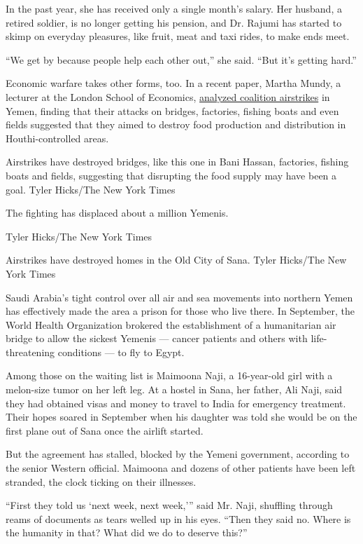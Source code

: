 In the past year, she has received only a single month's salary. Her
husband, a retired soldier, is no longer getting his pension, and Dr.
Rajumi has started to skimp on everyday pleasures, like fruit, meat and
taxi rides, to make ends meet.

``We get by because people help each other out,'' she said. ``But it's
getting hard.''

Economic warfare takes other forms, too. In a recent paper, Martha
Mundy, a lecturer at the London School of Economics,
\href{https://sites.tufts.edu/wpf/strategies-of-the-coalition-in-the-yemen-war/}{analyzed
coalition airstrikes} in Yemen, finding that their attacks on bridges,
factories, fishing boats and even fields suggested that they aimed to
destroy food production and distribution in Houthi-controlled areas.

Airstrikes have destroyed bridges, like this one in Bani Hassan,
factories, fishing boats and fields, suggesting that disrupting the food
supply may have been a goal. Tyler Hicks/The New York Times

The fighting has displaced about a million Yemenis.

 Tyler Hicks/The New York Times

Airstrikes have destroyed homes in the Old City of Sana. Tyler Hicks/The
New York Times

Saudi Arabia's tight control over all air and sea movements into
northern Yemen has effectively made the area a prison for those who live
there. In September, the World Health Organization brokered the
establishment of a humanitarian air bridge to allow the sickest Yemenis
--- cancer patients and others with life-threatening conditions --- to
fly to Egypt.

Among those on the waiting list is Maimoona Naji, a 16-year-old girl
with a melon-size tumor on her left leg. At a hostel in Sana, her
father, Ali Naji, said they had obtained visas and money to travel to
India for emergency treatment. Their hopes soared in September when his
daughter was told she would be on the first plane out of Sana once the
airlift started.

But the agreement has stalled, blocked by the Yemeni government,
according to the senior Western official. Maimoona and dozens of other
patients have been left stranded, the clock ticking on their illnesses.

``First they told us `next week, next week,''' said Mr. Naji, shuffling
through reams of documents as tears welled up in his eyes. ``Then they
said no. Where is the humanity in that? What did we do to deserve
this?''


